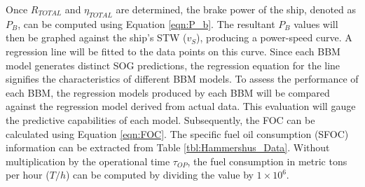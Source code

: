 Once $R_{TOTAL}$ and $\eta_{TOTAL}$ are determined, the brake power of the ship, denoted as $P_B$, can be computed using Equation \ref{eqn:P_b}. The resultant $P_B$ values will then be graphed against the ship's STW ($v_S$), producing a power-speed curve. A regression line will be fitted to the data points on this curve. Since each BBM model generates distinct SOG predictions, the regression equation for the line signifies the characteristics of different BBM models. To assess the performance of each BBM, the regression models produced by each BBM will be compared against the regression model derived from actual data. This evaluation will gauge the predictive capabilities of each model. Subsequently, the FOC can be calculated using Equation \ref{eqn:FOC}. The specific fuel oil consumption (SFOC) information can be extracted from Table \ref{tbl:Hammershus_Data}. Without multiplication by the operational time $\tau_{OP}$, the fuel consumption in metric tons per hour ($T/h$) can be computed by dividing the value by $1 \times 10^6$.


